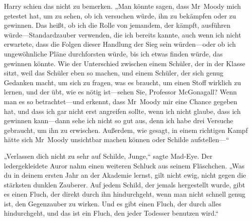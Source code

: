 Harry schien das nicht zu bemerken. „Man könnte sagen, dass Mr~Moody mich getestet hat, um zu sehen, ob ich versuchen würde, ihn zu bekämpfen oder zu gewinnen. Das heißt, ob ich die Rolle von jemandem, der kämpft, ausführen würde—Standardzauber verwenden, die ich bereits kannte, auch wenn ich nicht erwartete, dass die Folgen dieser Handlung der Sieg sein würden—oder ob ich ungewöhnliche Pläne durchforsten würde, bis ich etwas finden würde, das gewinnen könnte. Wie der Unterschied zwischen einem Schüler, der in der Klasse sitzt, weil das Schüler eben so machen, und einem Schüler, der sich genug Gedanken macht, um sich zu fragen, was es braucht, um einen Stoff wirklich zu lernen, und der übt, wie es nötig ist—sehen Sie, Professor McGonagall? Wenn man es so betrachtet—und erkennt, dass Mr~Moody mir eine Chance gegeben hat, und dass ich gar nicht erst angreifen sollte, wenn ich nicht glaube, dass ich gewinnen kann—dann sehe ich nicht so gut aus, denn ich habe drei Versuche gebraucht, um ihn zu erwischen. Außerdem, wie gesagt, in einem richtigen Kampf hätte sich Mr~Moody unsichtbar machen können oder Schilde aufstellen—“

„Verlassen dich nicht zu sehr auf Schilde, Junge,“ sagte Mad-Eye. Der ledergekleidete Auror nahm einen weiteren Schluck aus seinem Fläschchen. „Was du in deinem ersten Jahr an der Akademie lernst, gilt nicht ewig, nicht gegen die stärksten dunklen Zauberer. Auf jedem Schild, der jemals hergestellt wurde, gibt es einen Fluch, der direkt durch ihn hindurchgeht, wenn man nicht schnell genug ist, den Gegenzauber zu wirken. Und es gibt einen Fluch, der durch alles hindurchgeht, und das ist ein Fluch, den jeder Todesser benutzen wird.“


